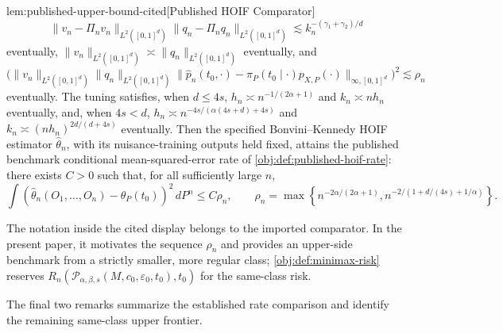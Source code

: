 \documentclass[11pt]{article}
\begin{document}
\begin{citedv}{lem:published-upper-bound-cited}[Published HOIF Comparator]
\[
\|v_n-\Pi_n v_n\|_{L^2([0,1]^d)}
\|q_n-\Pi_n q_n\|_{L^2([0,1]^d)}
\lesssim k_n^{-(\gamma_1+\gamma_2)/d}
\]
eventually, \(\|v_n\|_{L^2([0,1]^d)}\asymp\|q_n\|_{L^2([0,1]^d)}\) eventually, and
\[
\bigl(\|v_n\|_{L^2([0,1]^d)}
\|q_n\|_{L^2([0,1]^d)}
\|\hat p_n(t_0,\cdot)-\pi_P(t_0\mid\cdot)p_{X,P}(\cdot)\|_{\infty,[0,1]^d}\bigr)^2
\lesssim \rho_n
\]
eventually. The tuning satisfies, when \(d\le 4s\), \(h_n\asymp n^{-1/(2\alpha+1)}\) and \(k_n\asymp nh_n\) eventually, and, when \(4s<d\), \(h_n\asymp n^{-4s/(\alpha(4s+d)+4s)}\) and \(k_n\asymp(nh_n)^{2d/(d+4s)}\) eventually. Then the specified Bonvini--Kennedy HOIF estimator \(\hat\theta_n\), with its nuisance-training outputs held fixed, attains the published benchmark conditional mean-squared-error rate of \cref{obj:def:published-hoif-rate}: there exists \(C>0\) such that, for all sufficiently large \(n\),
\[
\int (\hat\theta_n(O_1,\ldots,O_n)-\theta_P(t_0))^2\,dP^n
\le C\rho_n,\qquad
\rho_n=
\max\left\{n^{-2\alpha/(2\alpha+1)},
n^{-2/(1+d/(4s)+1/\alpha)}\right\}.
\]
\end{citedv}

The notation inside the cited display belongs to the imported comparator. In the present paper, it motivates the sequence \(\rho_n\) and provides an upper-side benchmark from a strictly smaller, more regular class; \cref{obj:def:minimax-risk} reserves \(R_n(\mathcal P_{\alpha,\beta,s}(M,c_0,\varepsilon_0,t_0),t_0)\) for the same-class risk.

The final two remarks summarize the established rate comparison and identify the remaining same-class upper frontier.
\end{document}
